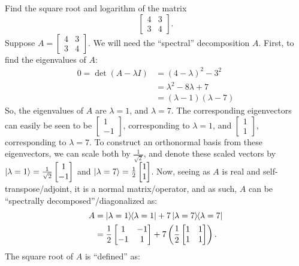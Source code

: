  Find the square root and logarithm of the matrix $$\begin{bmatrix}4&3\\3&4\end{bmatrix}.$$
\Soln
Suppose $A = \begin{bmatrix}
4 & 3 \\
3 & 4
\end{bmatrix} $.  We will need the ``spectral'' decomposition $A$.  First, to find the eigenvalues of $A$:
\begin{align*}
	0=\det (A - \lambda I ) &= (4-\lambda)^2 - 3^2\\
		&= \lambda^2 -8\lambda + 7\\
		&= (\lambda - 1)(\lambda - 7)
\end{align*}
So, the eigenvalues of $A$ are $\lambda = 1$, and $\lambda = 7$.  The corresponding eigenvectors can easily be seen to be
$\begin{bmatrix}
	1 \\
	-1
	\end{bmatrix}
$, corresponding to $\lambda=1$, and $\begin{bmatrix}
1 \\
1
\end{bmatrix}
$, corresponding to $\lambda=7$.  To construct an orthonormal basis from these eigenvectors, we can scale both by $\frac{1}{\sqrt{2}}$, and denote these scaled vectors by $\ket{\lambda=1}=\frac{1}{\sqrt{2}}\begin{bmatrix}
	1 \\
	-1
	\end{bmatrix}$ and $\ket{\lambda=7}=\frac{1}{2}\begin{bmatrix}
	1 \\
	1
	\end{bmatrix}$. Now, seeing as $A$ is real and self-transpose/adjoint, it is a normal matrix/operator, and as such, $A$ can be ``spectrally decomposed''/diagonalized as:
\begin{align*}
	A &= \ket{\lambda = 1}\hspace{-1mm} \bra{\lambda = 1} + 7 \ket{\lambda = 7}\hspace{-1mm} \bra{\lambda = 7}  \\
	&= \frac{1}{2}\begin{bmatrix}1&-1\\-1&1\end{bmatrix}+7\left(\frac{1}{2}\begin{bmatrix}1&1\\1&1\end{bmatrix}\right).\end{align*}
The square root of $A$ is ``defined'' as:
